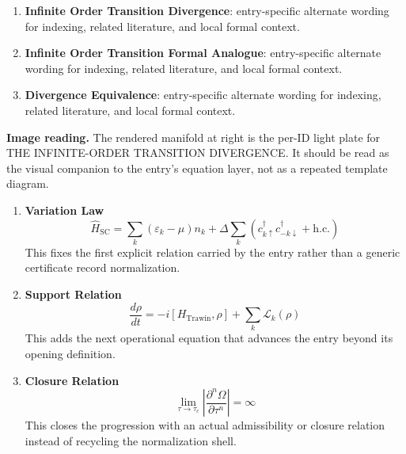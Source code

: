 \begin{enumerate}[leftmargin=1.6em,itemsep=6pt,topsep=4pt]
\item \textbf{Infinite Order Transition Divergence}: entry-specific alternate wording for indexing, related literature, and local formal context.
\item \textbf{Infinite Order Transition Formal Analogue}: entry-specific alternate wording for indexing, related literature, and local formal context.
\item \textbf{Divergence Equivalence}: entry-specific alternate wording for indexing, related literature, and local formal context.
\end{enumerate}

\begin{samepage}
\noindent\begin{minipage}[t]{0.45\linewidth}
\vspace{0pt}
\raggedright
\scriptsize\textbf{Image reading.} The rendered manifold at right is the per-ID light plate for THE INFINITE-ORDER TRANSITION DIVERGENCE. It should be read as the visual companion to the entry's equation layer, not as a repeated template diagram.\par
\end{minipage}\hfill
\begin{minipage}[t]{0.53\linewidth}
\vspace*{-0.10in}
\raggedright
{}
\end{minipage}
\end{samepage}

\clearpage


\begin{enumerate}[leftmargin=1.6em,itemsep=9pt,topsep=6pt]
\item \textbf{Variation Law}
\[
\widehat{H}_{\mathrm{SC}}
=
\sum_k(\varepsilon_k-\mu)n_k
+\Delta\sum_k\left(c^\dagger_{k\uparrow}c^\dagger_{-k\downarrow}+\mathrm{h.c.}\right)
\]
This fixes the first explicit relation carried by the entry rather than a generic certificate record normalization.

\item \textbf{Support Relation}
\[
\frac{d\rho}{dt}
=
-i[H_{\mathrm{Trawin}},\rho]
+\sum_k\mathcal{L}_k(\rho)
\]
This adds the next operational equation that advances the entry beyond its opening definition.

\item \textbf{Closure Relation}
\[
\lim_{\tau\to\tau_c}\left|\frac{\partial^n\Omega}{\partial\tau^n}\right|=\infty
\]
This closes the progression with an actual admissibility or closure relation instead of recycling the normalization shell.
\end{enumerate}

